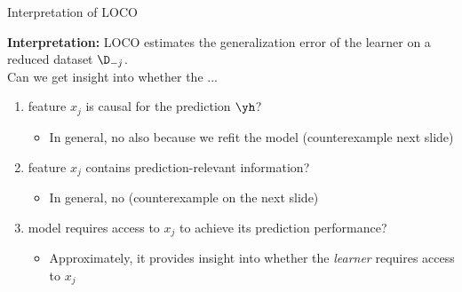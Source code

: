 \documentclass[11pt,compress,t,notes=noshow, aspectratio=169, xcolor=table]{beamer}
\begin{document}
\begin{frame}{Interpretation of LOCO}

\textbf{Interpretation:} LOCO estimates the generalization error of the learner on a reduced dataset $\D_{-j}$.\\
\lz
Can we get insight into whether the ...
\begin{enumerate}
    \item feature $x_j$ is causal for the prediction $\yh$?
    \begin{itemize}
      \item In general, no also because we refit the model (counterexample next slide)
    \end{itemize}
    \item feature $x_j$ contains prediction-relevant information?
    \begin{itemize}
      \item In general, no (counterexample on the next slide)
    \end{itemize}
    \item model requires access to $x_j$ to achieve its prediction performance?
    \begin{itemize}
      \item Approximately, it provides insight into whether the \textit{learner} requires access to $x_j$
    \end{itemize}
\end{enumerate}
\end{frame}
\end{document}
